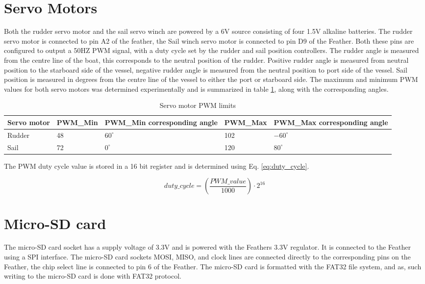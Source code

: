 \section{Servo Motors}
Both the rudder servo motor and the sail servo winch are powered by a 6V source consisting of four 1.5V alkaline batteries. The rudder servo motor is connected to pin
A2 of the feather, the Sail winch servo motor is connected to pin D9 of the Feather. Both these pins are configured to output a 50HZ PWM signal, with a duty cycle set
by the rudder and sail position controllers. The rudder angle is measured from the centre line of the boat, this corresponds to the neutral position of the rudder. Positive 
rudder angle is measured from neutral position to the starboard side of the vessel, negative rudder angle is measured from the neutral position to port side of the vessel. 
Sail position is measured in degrees from the centre line of the vessel to either the port or starboard side. The maximum and minimum PWM values for both servo motors was 
determined experimentally and is summarized in table \ref{table:pwm}, along with the corresponding angles. 

\begin{table}[!h]
    \centering
    \caption{Servo motor PWM limits}
    \label{table:pwm}
    \begin{tabularx}{\columnwidth}{ | X | X | X | X | X | }
        
        \hline
        Servo motor & PWM\_Min & PWM\_Min corresponding angle & PWM\_Max & PWM\_Max corresponding angle \\
        \hline
        Rudder & 48 & $60^{\circ}$ & 102 & $-60^{\circ}$ \\
        \hline
        Sail & 72 &  $0^{\circ}$ & 120 & $80^{\circ}$\\
        \hline
    \end{tabularx}
\end{table}

The PWM duty cycle value is stored in a 16 bit register and is determined using Eq. \ref{eq:duty_cycle}.

\begin{equation}
    \label{eq:duty_cycle}
    duty\_cycle = (\frac{PWM\_value}{1000}) \cdot 2^{16}
\end{equation}

\section{Micro-SD card}
The micro-SD card socket has a supply voltage of 3.3V and is powered with the Feathers 3.3V regulator. It is connected to the Feather using a SPI interface. The micro-SD card sockets MOSI, MISO,
 and clock lines are connected directly to the corresponding pins on the Feather, the chip select line is connected to pin 6 of the Feather. The micro-SD card is formatted with the FAT32 file 
 system, and as, such writing to the micro-SD card is done with FAT32 protocol.


